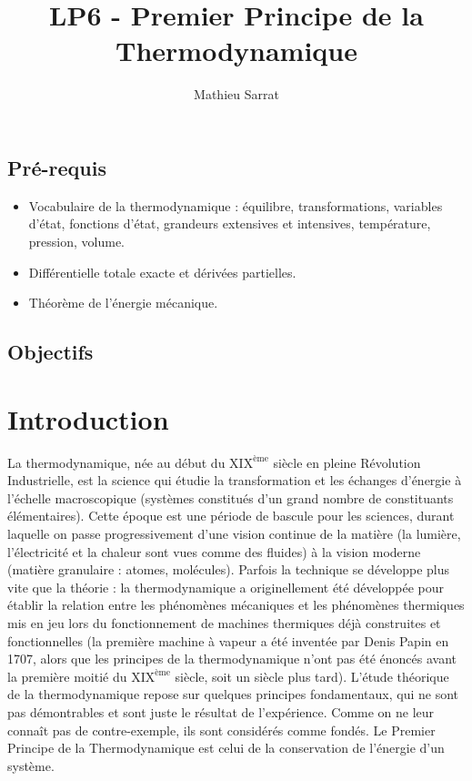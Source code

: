 \documentclass[11pt,a4paper]{report}
\author{Mathieu Sarrat}
\title{LP6 - Premier Principe de la Thermodynamique}
\begin{document}
\maketitle

\subsection{Pré-requis}
\begin{itemize}
	\item Vocabulaire de la thermodynamique : équilibre, transformations, variables d'état, 
	fonctions d'état, grandeurs extensives et intensives, température, pression, volume.
	\item Différentielle totale exacte et dérivées partielles.
	\item Théorème de l'énergie mécanique.
\end{itemize}

\subsection{Objectifs}

\newpage
\section{Introduction}

La thermodynamique, née au début du $\text{XIX}^\text{ème}$ siècle en pleine Révolution Industrielle, est la science qui étudie la transformation et les échanges d'énergie à l'échelle macroscopique (systèmes constitués d'un grand nombre de constituants élémentaires). Cette époque est une période de bascule pour les sciences, durant laquelle on passe progressivement d'une vision continue de la matière (la lumière, l'électricité et la chaleur sont vues comme des fluides) à la vision moderne (matière granulaire : atomes, molécules). Parfois la technique se développe plus vite que la théorie : la thermodynamique a originellement été développée pour établir la relation entre les phénomènes mécaniques et les phénomènes thermiques mis en jeu lors du fonctionnement de machines thermiques déjà construites et fonctionnelles (la première machine à vapeur a été inventée par Denis Papin en 1707, alors que les principes de la thermodynamique n'ont pas été énoncés avant la première moitié du $\text{XIX}^\text{ème}$ siècle, soit un siècle plus tard). L'étude théorique de la thermodynamique repose sur quelques principes fondamentaux, qui ne sont pas démontrables et sont juste le résultat de l'expérience. Comme on ne leur connaît pas de contre-exemple, ils sont considérés comme fondés. Le Premier Principe de la Thermodynamique est celui de la conservation de l'énergie d'un système.
\end{document}
